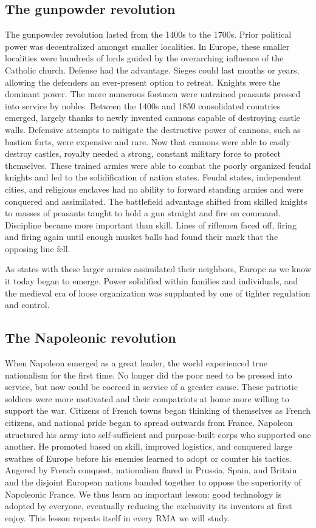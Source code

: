 \documentclass[nobib]{tufte-handout}
\begin{document}
\subsection{The gunpowder revolution}
The gunpowder revolution lasted from the 1400s to the 1700s.
Prior political power was decentralized amongst 
smaller localities. In Europe, these smaller localities were hundreds of lords 
guided by the overarching influence of the Catholic church. Defense had the advantage. 
Sieges could last months or years, allowing the defenders an ever-present option to retreat. 
Knights were the dominant power. The more numerous footmen were untrained peasants 
pressed into service by nobles. Between the 1400s and 1850 consolidated countries emerged,
largely thanks to newly invented cannons capable of destroying castle walls. 
Defensive attempts to mitigate the destructive power of cannons, such as bastion forts, were expensive
and rare. Now that cannons were able to easily destroy castles, 
royalty needed a strong, constant military force to protect themselves. 
These trained armies were able to combat the poorly organized feudal knights 
and led to the solidification of nation states. Feudal states, independent cities, 
and religious enclaves had no ability to forward standing armies and were conquered 
and assimilated. The battlefield advantage shifted from skilled knights to
masses of peasants taught to hold a gun straight and fire on command. 
Discipline became more important than skill. Lines of riflemen 
faced off, firing and firing again 
until enough musket balls had found their mark that the opposing line 
fell. 

As states with these larger armies assimilated their 
neighbors, Europe as we know it today began 
to emerge. Power solidified within families 
and individuals, and the medieval era of loose organization 
was supplanted by one of tighter regulation and control. 

\subsection{The Napoleonic revolution}

When Napoleon emerged as a great leader, the world 
experienced true nationalism for the first time. No 
longer did the poor need to be pressed into service, 
but now could be coerced in service of a greater cause. 
These patriotic soldiers were more motivated and 
their compatriots at home more willing to support 
the war. Citizens of French towns began thinking of 
themselves as French citizens, and national pride 
began to spread outwards from France. Napoleon structured his 
army into self-sufficient and purpose-built corps who supported 
one another. He promoted based on skill, improved logistics, 
and conquered large swathes of Europe before his enemies learned 
to adopt or counter his tactics. Angered by French conquest, 
nationalism flared in Prussia, Spain, and Britain and 
the disjoint European nations banded together to oppose the 
superiority of Napoleonic France. We thus learn an important lesson:
good technology is adopted by everyone, eventually reducing the 
exclusivity its inventors at first enjoy. This lesson repeats itself 
in every RMA we will study. 
\end{document}

